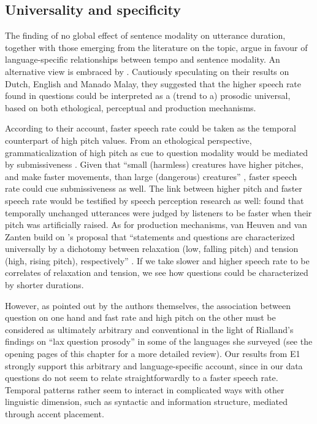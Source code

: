 \subsection{Universality and specificity}\label{sec451}
The finding of no global effect of sentence modality on utterance duration, together with those emerging from the literature on the topic, argue in favour of language-specific relationships between tempo and sentence modality. An alternative view is embraced by \citet{vanheuven2005speech}. Cautiously speculating on their results on Dutch, English and Manado Malay, they suggested that the higher speech rate found in questions could be interpreted as a (trend to a) prosodic universal, based on both ethological, perceptual and production mechanisms. 

According to their account, faster speech rate could be taken as the temporal counterpart of high pitch values. From an ethological perspective, grammaticalization of high pitch as cue to question modality would be mediated by submissiveness \citep{ohala1984ethological,gussenhoven2004phonology}. Given that ``small (harmless) creatures have higher pitches, and make faster movements, than large (dangerous) creatures'' \citep[97]{vanheuven2005speech}, faster speech rate could cue submissiveness as well. The link between higher pitch and faster speech rate would be testified by speech perception research as well: \citet{rietveld1987perceived} found that temporally unchanged utterances were judged by listeners to be faster when their pitch was artificially raised. As for production mechanisms, van Heuven and van Zanten build on \citeauthor{bolinger1964intonation}'s \citeyearpar{bolinger1964intonation,bolinger1989intonation} proposal that ``statements and questions are characterized universally by a dichotomy between relaxation (low, falling pitch) and tension (high, rising pitch), respectively'' \citep[\textit{ibid.}]{vanheuven2005speech}. If we take slower and higher speech rate to be correlates of relaxation and tension, we see how questions could be characterized by shorter durations. 

However, as pointed out by the authors themselves, the association between question on one hand and fast rate and high pitch on the other must be considered as ultimately arbitrary and conventional in the light of Rialland's findings on ``lax question prosody'' in some of the languages she surveyed (see the opening pages of this chapter for a more detailed review). Our results from E1 strongly support this arbitrary and language-specific account, since in our data questions do not seem to relate straightforwardly to a faster speech rate. Temporal patterns rather seem to interact in complicated ways with other linguistic dimension, such as syntactic and information structure, mediated through accent placement.

